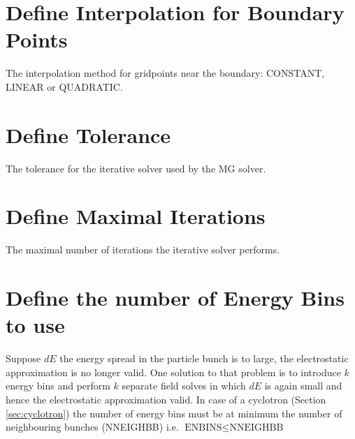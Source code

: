 \section{Define Interpolation for Boundary Points}
\label{sec:INTERPL}
The interpolation method for gridpoints near the boundary: CONSTANT, LINEAR or QUADRATIC.

\section{Define Tolerance}
\label{sec:TOL}
The tolerance for the iterative solver used by the MG solver.

\section{Define Maximal Iterations}
\label{sec:MAXITERS}
The maximal number of iterations the iterative solver performs.

\section{Define the number of Energy Bins to use}
\label{sec:FSENBINS}
Suppose $dE$ the energy spread in the particle bunch is to large, the electrostatic approximation is no longer valid. 
One solution to that problem is to introduce  $k$ energy bins  and perform $k$ separate field solves
in which $dE$ is again small and hence the electrostatic approximation valid. In case of a cyclotron 
(Section \ref{sec:cyclotron}) the number of energy bins must be at minimum the number of neighbouring bunches (NNEIGHBB) i.e.  $\text{ENBINS} \le \text{NNEIGHBB}$ 
